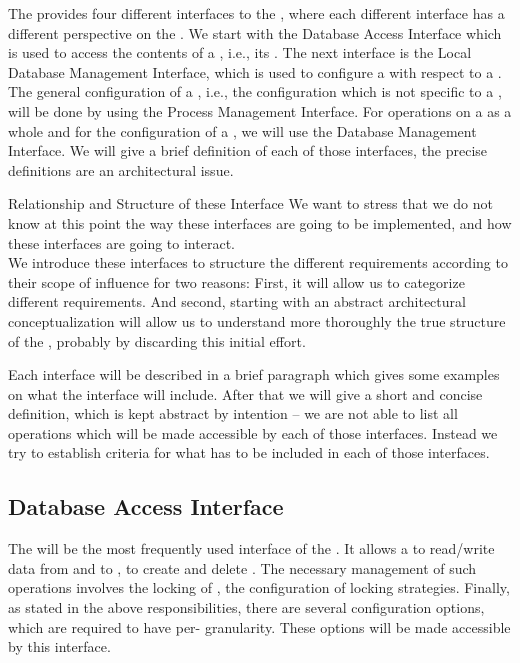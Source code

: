\documentclass[a4paper, 12pt]{book}
\begin{document}
The \SYNEIGHT provides four different interfaces to the ,
where each different interface has a different perspective on the
\SYNEIGHT. 
%
We start with the Database Access Interface which is used to access
the contents of a , i.e., its .
%
The next interface is the Local Database Management Interface, which
is used to configure a  with respect to a
. 
%
The general configuration of a , i.e., the configuration
which is not specific to a , will be done by using the
Process Management Interface.
%
For operations on a  as a whole and for the configuration
of a , we will use the Database Management Interface. 
%
We will give a brief definition of each of those interfaces, the precise
definitions are an architectural issue.
%
\begin{remark*}{Relationship and Structure of these Interface}
  We want to stress that we do not know at this point the way these
  interfaces are going to be implemented, and how these interfaces are
  going to interact.\\
  We introduce these interfaces to structure the different
  requirements according to their scope of influence for two reasons:
  First, it will allow us to categorize different requirements. And
  second, starting with an abstract architectural conceptualization
  will allow us to understand more thoroughly the true structure of
  the \SYNEIGHT, probably by discarding this initial effort.
\end{remark*}
%
Each interface will be described in a brief paragraph which gives some examples
on what the interface will include. After that we will give a short and concise
definition, which is kept abstract by intention -- we are not able to list all
operations which will be made accessible by each of those interfaces. Instead
we try to establish criteria for what has to be included in each of those
interfaces.

\subsection{Database Access Interface}

The  will be the most frequently used
interface of the \SYNEIGHT. It allows a  to
read/write data from and to , to create and delete
. The necessary management of such operations involves
the locking of , the configuration of locking
strategies. Finally, as stated in the above responsibilities, there
are several configuration options, which are required to have
per- granularity. These options will be made accessible by
this interface.
\end{document}
